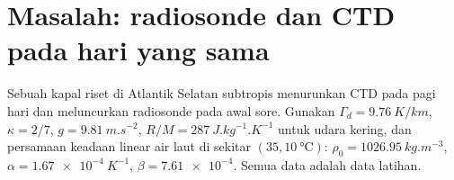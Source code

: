 \section{Masalah: radiosonde dan CTD pada hari yang sama}

\begin{problem}
\label{pb:b1:fluid-envelopes-structure:1}
Sebuah kapal riset di Atlantik Selatan subtropis menurunkan CTD pada pagi hari dan
meluncurkan radiosonde pada awal sore. Gunakan $\Gamma_d =
\qty{9.76}{K/km}$, $\kappa = 2/7$, $g = \qty{9.81}{m.s^{-2}}$, $R/M =
\qty{287}{J.kg^{-1}.K^{-1}}$ untuk udara kering, dan persamaan keadaan linear air laut
di sekitar $(35, \qty{10}{\celsius})$: $\rho_0 = \qty{1026.95}{kg.m^{-3}}$,
$\alpha = \qty{1.67e-4}{K^{-1}}$, $\beta = \num{7.61e-4}$. Semua data adalah data latihan.


\end{problem}
